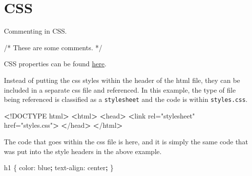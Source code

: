 \documentclass[]{book}
\newenvironment{Shaded}{\begin{snugshade}}{\end{snugshade}}
\newcommand{\KeywordTok}[1]{\textcolor[rgb]{0.13,0.29,0.53}{\textbf{#1}}}
\newcommand{\StringTok}[1]{\textcolor[rgb]{0.31,0.60,0.02}{#1}}
\newcommand{\FunctionTok}[1]{\textcolor[rgb]{0.00,0.00,0.00}{#1}}
\newcommand{\OperatorTok}[1]{\textcolor[rgb]{0.81,0.36,0.00}{\textbf{#1}}}
\newcommand{\ExtensionTok}[1]{#1}
\newcommand{\NormalTok}[1]{#1}
\begin{document}
\section{CSS}\label{css}

Commenting in CSS.

\begin{Shaded}
\begin{Highlighting}[]
\ExtensionTok{/*}
\ExtensionTok{These}\NormalTok{ are some comments.}
\ExtensionTok{*/}
\end{Highlighting}
\end{Shaded}

CSS properties can be found
\href{https://developer.mozilla.org/en-US/docs/Web/CSS/Reference}{here}.

Instead of putting the css styles within the header of the html file,
they can be included in a separate css file and referenced. In this
example, the type of file being referenced is classified as a
\texttt{stylesheet} and the code is within \texttt{styles.css}.

\begin{Shaded}
\begin{Highlighting}[]
\OperatorTok{<}\NormalTok{!}\ExtensionTok{DOCTYPE}\NormalTok{ html}\OperatorTok{>}         
\OperatorTok{<}\ExtensionTok{html}\OperatorTok{>}                  
    \OperatorTok{<}\FunctionTok{head}\OperatorTok{>}                                       
        \OperatorTok{<}\FunctionTok{link}\NormalTok{ rel=}\StringTok{"stylesheet"}\NormalTok{ href=}\StringTok{"styles.css"}\OperatorTok{>}
    \OperatorTok{<}\NormalTok{/}\ExtensionTok{head}\OperatorTok{>}                                      
\OperatorTok{<}\NormalTok{/}\ExtensionTok{html}\OperatorTok{>}                 
\end{Highlighting}
\end{Shaded}

The code that goes within the css file is here, and it is simply the
same code that was put into the style headers in the above example.

\begin{Shaded}
\begin{Highlighting}[]
\ExtensionTok{h1}\NormalTok{ \{                   }
    \ExtensionTok{color}\NormalTok{: blue}\KeywordTok{;}       
    \ExtensionTok{text-align}\NormalTok{: center}\KeywordTok{;}
\NormalTok{\}                      }
\end{Highlighting}
\end{Shaded}
\end{document}
